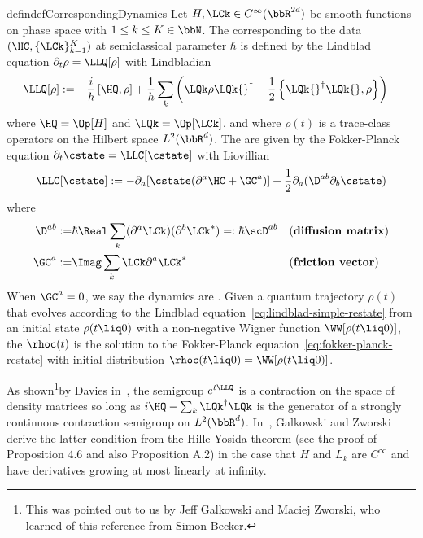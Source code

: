 \documentclass{article}
\numberwithin{equation}{section}
\begin{document}
\begin{restatable}{defin}{defCorrespondingDynamics}
\label{def:correspondingDynamics}
Let $H, \LCk \in C^\infty(\bbR^{2d})$ be smooth functions on phase space with $1\leq k\leq K\in\bbN$. The  corresponding to the data $(\HC,\{\LCk\}_{k=1}^K)$ at semiclassical parameter $\hbar$ is defined by the Lindblad equation $\partial_t \rho =\LLQ [\rho]$ with Lindbladian 
\begin{align} \label{eq:lindblad-simple-restate}
    \LLQ [\rho] &:= -\frac{i}{\hbar}\left[\HQ,\rho\right]+ \frac{1}{\hbar}\sum_{k} \left(\LQk \rho \LQk{}^\dagger-\frac{1}{2}\left\{\LQk{}^\dagger\LQk{},\rho\right\}\right)
\end{align}
where $\HQ=\Op[H]$ and $\LQk=\Op[\LCk]$, and
where $\rho(t)$ is a trace-class operators on the Hilbert space
$L^2(\bbR^d)$.
The  are given by the 
Fokker-Planck equation $\partial_t \cstate = \LLC [\cstate]$ with Liovillian
\begin{equation}
\label{eq:fokker-planck-restate}
\LLC [\cstate] := 
 -\partial_a [\cstate (\partial^a \HC +  \GC^a)]  +
 \frac{1}{2} \partial_a (\D^{ab} \partial_b \cstate)
 \end{equation}
where 
\begin{align}
    \label{eq:diffusion-matrix}
    \D^{ab} :=&\hbar \Real \sum_k (\partial^a \LCk)(\partial^b \LCk^*)=: \hbar  \scD^{ab} & & (\textbf{diffusion matrix})\\
    \label{eq:friction-vector}
    \GC^a :=& 
     \Imag \sum_k \LCk \partial^a \LCk^* & & (\textbf{friction vector})
\end{align}  
When $\GC^a=0$, we say the dynamics are . 
Given a quantum trajectory $\rho(t)$ that evolves according to the Lindblad equation~\eqref{eq:lindblad-simple-restate} from an initial state $\rho(t\liq 0)$ with a non-negative Wigner function $\WW[\rho(t\liq 0)]$, the  $\rhoc(t)$ is the solution to the Fokker-Planck equation~\eqref{eq:fokker-planck-restate} with initial distribution $\rhoc(t\liq 0) = \WW[\rho(t\liq 0)]$.
\end{restatable}
\noindent  As shown\footnote{This was pointed out to us by Jeff Galkowski and Maciej Zworski, who learned of this reference from Simon Becker.}by Davies in~\cite{davies1977neutron}, the semigroup $e^{t\LLQ}$ is a contraction on the space of density matrices so long as $i\HQ -\sum_k \LQk^\dagger\LQk$ is the generator of a strongly continuous contraction semigroup on $L^2(\bbR^d)$. In~\cite{galkowski2024classical}, Galkowski and Zworski derive the latter condition from the Hille-Yosida theorem (see the proof of Proposition 4.6 and also Proposition A.2) in the case that $H$ and $L_k$ are $C^\infty$ and have derivatives growing at most linearly
at infinity.
\end{document}

